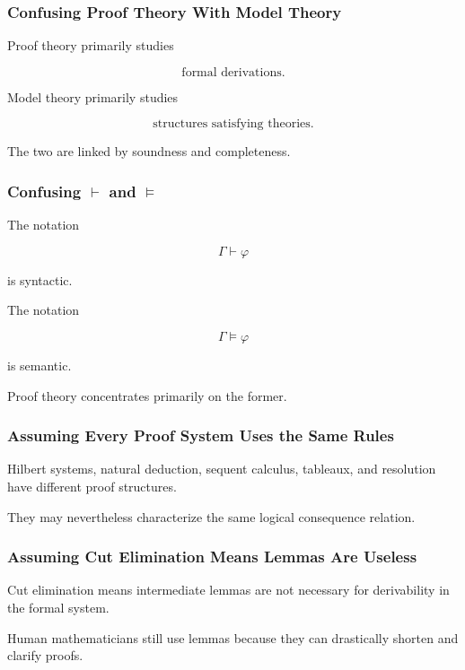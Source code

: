 \subsubsection{Confusing Proof Theory With Model Theory}

Proof theory primarily studies

\[
\boxed{
\text{formal derivations}.
}
\]

Model theory primarily studies

\[
\boxed{
\text{structures satisfying theories}.
}
\]

The two are linked by soundness and completeness.

\subsubsection{Confusing \(\vdash\) and \(\models\)}

The notation

\[
\Gamma\vdash\varphi
\]

is syntactic.

The notation

\[
\Gamma\models\varphi
\]

is semantic.

Proof theory concentrates primarily on the former.

\subsubsection{Assuming Every Proof System Uses the Same Rules}

Hilbert systems, natural deduction, sequent calculus, tableaux, and
resolution have different proof structures.

They may nevertheless characterize the same logical consequence relation.

\subsubsection{Assuming Cut Elimination Means Lemmas Are Useless}

Cut elimination means intermediate lemmas are not necessary for
derivability in the formal system.

Human mathematicians still use lemmas because they can drastically shorten
and clarify proofs.

